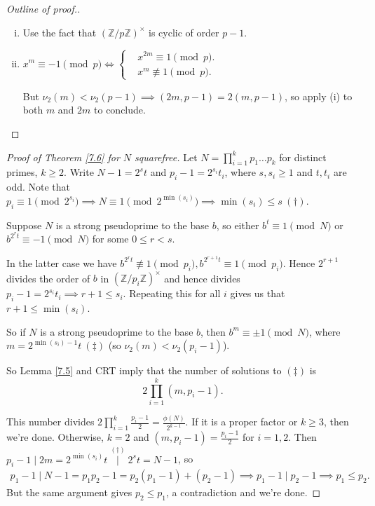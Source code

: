 \documentclass{article}
\theoremstyle{definition}
\begin{document}
\begin{proof}[Outline of proof.]
    \begin{enumerate}[(i)]
        \item Use the fact that $(\mathbb{Z}/p\mathbb{Z})^\times$ is cyclic of order $p-1$.
        \item $x^m \equiv -1\pmod{p} \iff \begin{cases}
            &x^{2m} \equiv 1\pmod{p}.\\
            &x^m \not\equiv 1 \pmod{p}.
        \end{cases}$

        But $\nu_2(m)<\nu_2(p-1) \implies (2m,p-1)=2(m,p-1)$, so apply (i) to both $m$ and $2m$ to conclude.
    \end{enumerate}
\end{proof}
\begin{proof}[Proof of Theorem \ref{7.6} for $N$ squarefree]
    Let $N=\prod_{i=1}^{k} p_1\ldots p_k$ for distinct primes, $k\ge 2$. Write $N-1=2^st$ and $p_i-1=2^{s_i}t_i$, where $s,s_i\ge 1$ and $t,t_i$ are odd. Note that $p_i \equiv 1 \pmod{2^{s_i}} \implies N \equiv 1\pmod{2^{\min(s_i)}} \implies {\min(s_i)\le s ~(\dagger)}$.
    \vspace{1mm}
    
    Suppose $N$ is a strong pseudoprime to the base $b$, so either $b^t \equiv 1\pmod{N}$ or $b^{2^rt} \equiv -1\pmod{N}$ for some $0\le r<s$.
    \vspace{1mm}
    
    In the latter case we have $b^{2^rt} \not\equiv 1 \pmod{p_i}, b^{2^{r+1}t} \equiv 1 \pmod{p_i}$. Hence $2^{r+1}$ divides the order of $b$ in $(\mathbb{Z}/p_i\mathbb{Z})^{\times}$ and hence divides $p_i-1=2^{s_i}t_i \implies r+1\le s_i$. Repeating this for all $i$ gives us that $r+1\le \min(s_i)$. 
    \vspace{1mm}
    
    So if $N$ is a strong pseudoprime to the base $b$, then $b^m \equiv \pm 1 \pmod{N}$, where $m=2^{\min(s_i)-1}t ~(\ddagger)$ (so $\nu_2(m)<\nu_2(p_i-1)$).

    So Lemma \ref{7.5} and CRT imply that the number of solutions to $(\ddagger)$ is $$2 \prod_{i=1}^{k} (m,p_i-1).$$

    This number divides $2\prod_{i=1}^{k} \frac{p_i-1}{2} = \frac{\phi(N)}{2^{k-1}}$. If it is a proper factor or $k\ge 3$, then we're done. Otherwise, $k=2$ and $(m,p_i-1)=\frac{p_i-1}{2}$ for $i=1,2$. Then $p_i -1 \mid 2m = 2^{\min(s_i)}t \stackrel{(\dagger)}{\mid } 2^s t = N-1$, so
    \begin{align*}
        p_1-1 \mid N-1 = p_1p_2-1 = p_2(p_1-1) + (p_2-1) \implies p_1-1 \mid p_2-1 \implies p_1\le p_2.
    \end{align*}
    But the same argument gives $p_2\le p_1$, a contradiction and we're done.
\end{proof}
\end{document}
